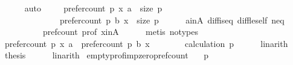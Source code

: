 \begin{isabellebody}
\ \ \ \ \isamarkupfalse%
\ auto\isanewline
\ \ \isamarkupfalse%
\ {}{\isacharcolon}{\kern0pt}\ {\isachardoublequoteopen}{\isacharparenleft}{\kern0pt}prefer{\isacharunderscore}{\kern0pt}count\ p\ x\ a{\isacharparenright}{\kern0pt}\ {\isacharminus}{\kern0pt}\ {\isacharparenleft}{\kern0pt}size\ p{\isacharparenright}{\kern0pt}\ {\isasymle}\isanewline
\ \ \ \ \ \ \ \ \ \ \ \ \ \ {\isacharparenleft}{\kern0pt}prefer{\isacharunderscore}{\kern0pt}count\ p\ b\ x{\isacharparenright}{\kern0pt}\ {\isacharminus}{\kern0pt}\ {\isacharparenleft}{\kern0pt}size\ p{\isacharparenright}{\kern0pt}{\isachardoublequoteclose}\isanewline
\ \ \ \ \isamarkupfalse%
\ a{\isacharunderscore}{\kern0pt}in{\isacharunderscore}{\kern0pt}A\ diff{\isacharunderscore}{\kern0pt}is{\isacharunderscore}{\kern0pt}{}{\isacharunderscore}{\kern0pt}eq\ diff{\isacharunderscore}{\kern0pt}le{\isacharunderscore}{\kern0pt}self\ neq{}\isanewline
\ \ \ \ \ \ \ \ \ \ pref{\isacharunderscore}{\kern0pt}count\ prof\ x{\isacharunderscore}{\kern0pt}in{\isacharunderscore}{\kern0pt}A\isanewline
\ \ \ \ \isamarkupfalse%
\ {\isacharparenleft}{\kern0pt}metis\ {\isacharparenleft}{\kern0pt}no{\isacharunderscore}{\kern0pt}types{\isacharparenright}{\kern0pt}{\isacharparenright}{\kern0pt}\isanewline
\ \ \isamarkupfalse%
\ {\isachardoublequoteopen}{\isacharparenleft}{\kern0pt}prefer{\isacharunderscore}{\kern0pt}count\ p\ x\ a{\isacharparenright}{\kern0pt}\ {\isasymle}\ {\isacharparenleft}{\kern0pt}prefer{\isacharunderscore}{\kern0pt}count\ p\ b\ x{\isacharparenright}{\kern0pt}{\isachardoublequoteclose}\isanewline
\ \ \ \ \isamarkupfalse%
\ {\isachardoublequoteopen}{}{\isachardoublequoteclose}\ {\isachardoublequoteopen}{}{\isachardoublequoteclose}\ calculation\ p{}\isanewline
\ \ \ \ \isamarkupfalse%
\ linarith\isanewline
\ \ \isamarkupfalse%
\ {\isacharquery}{\kern0pt}thesis\isanewline
\ \ \ \ \isamarkupfalse%
\ linarith\isanewline
{}\isamarkupfalse%
%
\endisatagproof
{\isafoldproof}%
%
\isadelimproof
\isanewline
%
\endisadelimproof
\isanewline
{}\isamarkupfalse%
\ empty{\isacharunderscore}{\kern0pt}prof{\isacharunderscore}{\kern0pt}imp{\isacharunderscore}{\kern0pt}zero{\isacharunderscore}{\kern0pt}pref{\isacharunderscore}{\kern0pt}count{\isacharcolon}{\kern0pt}\isanewline
\ \ \ {\isachardoublequoteopen}p\ {\isacharequal}{\kern0pt}\ {\isacharbrackleft}{\kern0pt}{\isacharbrackright}{\kern0pt}{\isachardoublequoteclose}\isanewline

\end{isabellebody}
